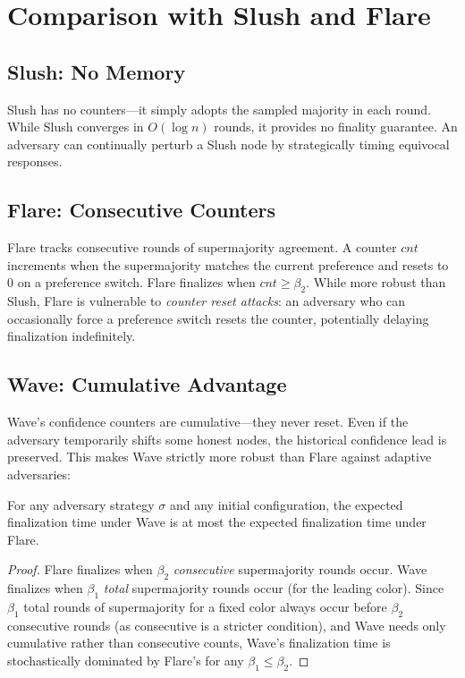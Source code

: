 \section{Comparison with Slush and Flare}

\label{sec:wave-comparison}

\subsection{Slush: No Memory}

Slush has no counters---it simply adopts the sampled majority in each round. While Slush
converges in $O(\log n)$ rounds, it provides no finality guarantee. An adversary can
continually perturb a Slush node by strategically timing equivocal responses.

\subsection{Flare: Consecutive Counters}

Flare tracks consecutive rounds of supermajority agreement. A counter $cnt$ increments
when the supermajority matches the current preference and resets to 0 on a preference
switch. Flare finalizes when $cnt \geq \beta_2$. While more robust than Slush, Flare
is vulnerable to \emph{counter reset attacks}: an adversary who can occasionally force
a preference switch resets the counter, potentially delaying finalization indefinitely.

\subsection{Wave: Cumulative Advantage}

Wave's confidence counters are cumulative---they never reset. Even if the adversary
temporarily shifts some honest nodes, the historical confidence lead is preserved.
This makes Wave strictly more robust than Flare against adaptive adversaries:

\begin{proposition}
\label{prop:dominance}
For any adversary strategy $\sigma$ and any initial configuration, the expected
finalization time under Wave is at most the expected finalization time under Flare.
\end{proposition}

\begin{proof}
Flare finalizes when $\beta_2$ \emph{consecutive} supermajority rounds occur. Wave
finalizes when $\beta_1$ \emph{total} supermajority rounds occur (for the leading color).
Since $\beta_1$ total rounds of supermajority for a fixed color always occur before
$\beta_2$ consecutive rounds (as consecutive is a stricter condition), and Wave needs
only cumulative rather than consecutive counts, Wave's finalization time is stochastically
dominated by Flare's for any $\beta_1 \leq \beta_2$.
\end{proof}

